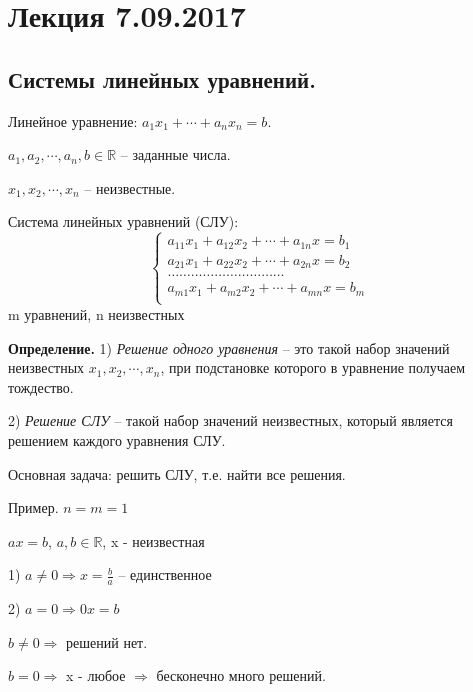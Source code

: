 \section{Лекция 7.09.2017}
\subsection{Системы линейных уравнений.}

Линейное уравнение: $a_1 x_1 + \cdots + a_n x_n = b$.

$a_1, a_2, \cdots, a_n, b \in \mathbb{R}$ -- заданные числа.

$x_1, x_2, \cdots, x_n$ -- неизвестные.

\vspace{\baselineskip}
Система линейных уравнений (СЛУ):
\begin{equation*}
	\left\{
		\begin{aligned}
        a_{11}x_1 + a_{12}x_2 + \cdots + a_{1n}x = b_1 \\
        a_{21}x_1 + a_{22}x_2 + \cdots + a_{2n}x = b_2 \\
        \hdots \hdots \hdots \hdots \hdots \hdots \hdots \hdots \hdots \hdots\\
        a_{m1}x_1 + a_{m2}x_2 + \cdots + a_{mn}x = b_m \\
		\end{aligned}
	\right.
\end{equation*}
m уравнений, n неизвестных

\vspace{\baselineskip}
\textbf{Определение.} 1) \textit{Решение одного уравнения} -- это такой набор значений неизвестных $x_1, x_2, \cdots, x_n$, при подстановке которого в уравнение получаем тождество.

2) \textit{Решение СЛУ} -- такой набор значений неизвестных, который является решением каждого уравнения СЛУ.

\vspace{\baselineskip}
Основная задача: решить СЛУ, т.е. найти все решения.

\vspace{\baselineskip}
Пример. $n = m = 1$

$ax = b$, $a, b \in \mathbb{R}$, x - неизвестная

1) $a \neq 0 \Rightarrow x = \frac{b}{a}$ -- единственное

2) $a = 0 \Rightarrow 0x = b$

$b \neq 0 \Rightarrow$ решений нет.

$b = 0 \Rightarrow$ x - любое $\Rightarrow$ бесконечно много решений.

